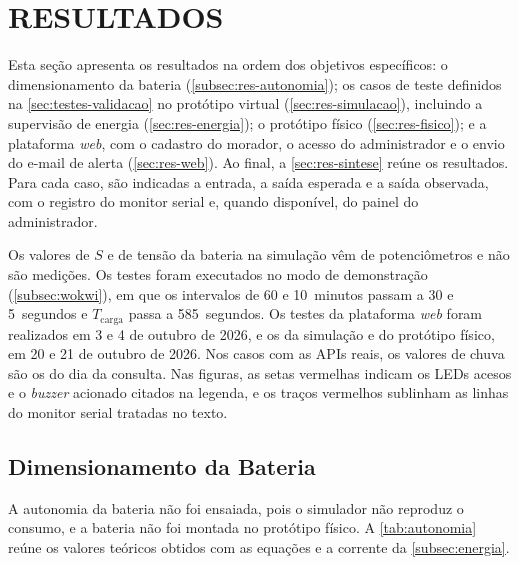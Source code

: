 \chapter{RESULTADOS}
\label{cap:resultados}
\sloppy

Esta seção apresenta os resultados na ordem dos objetivos
específicos: o dimensionamento da bateria (\autoref{subsec:res-autonomia});
os casos de teste definidos na \autoref{sec:testes-validacao} no
protótipo virtual (\autoref{sec:res-simulacao}), incluindo a supervisão
de energia (\autoref{sec:res-energia}); o protótipo físico
(\autoref{sec:res-fisico}); e a plataforma \textit{web}, com o cadastro do
morador, o acesso do administrador e o envio do e-mail de alerta
(\autoref{sec:res-web}). Ao final, a \autoref{sec:res-sintese} reúne os
resultados.
Para cada caso, são indicadas a entrada, a saída esperada e a saída
observada, com o registro do monitor serial e, quando disponível, do
painel do administrador.

Os valores de $S$ e de tensão da bateria na simulação vêm de
potenciômetros e não são medições. Os testes foram executados no modo
de demonstração (\autoref{subsec:wokwi}), em que os intervalos de 60 e
10~minutos passam a 30 e 5~segundos e $T_{\mathrm{carga}}$ passa a
585~segundos.
Os testes da plataforma \textit{web} foram realizados em 3 e 4 de
outubro de 2026, e os da simulação e do protótipo físico, em 20 e 21 de
outubro de 2026. Nos casos com as APIs reais, os valores de chuva são os
do dia da consulta.
Nas figuras, as setas vermelhas indicam os LEDs acesos e o
\textit{buzzer} acionado citados na legenda, e os traços vermelhos
sublinham as linhas do monitor serial tratadas no texto.

\section{Dimensionamento da Bateria}
\label{subsec:res-autonomia}

A autonomia da bateria não foi ensaiada, pois o simulador não reproduz o
consumo, e a bateria não foi montada no protótipo físico. A
\autoref{tab:autonomia} reúne os valores teóricos obtidos com as
equações e a corrente da \autoref{subsec:energia}.


